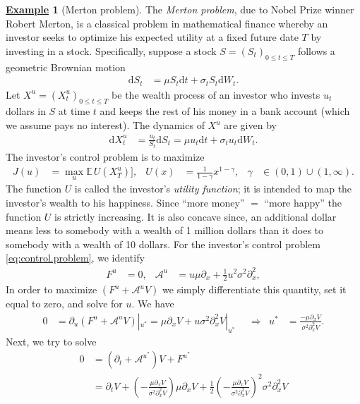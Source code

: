 \documentclass[12pt]{book}
\numberwithin{equation}{chapter}
\theoremstyle{plain}
\numberwithin{theorem}{section}
\theoremstyle{definition}
\newtheorem{example}[theorem]{\underline{Example}}
\numberwithin{exercise}{chapter}
\newcommand{\<}{\langle}
\renewcommand{\>}{\rangle}
\renewcommand{\(}{\left(}
\renewcommand{\)}{\right)}
\renewcommand{\[}{\left[}
\renewcommand{\]}{\right]}
\newcommand\Eb{\mathds{E}}
\newcommand\Ac{\mathscr{A}}
\newcommand\sig{\sigma}
\newcommand\gam{\gamma}
\renewcommand\d{\partial}
\newcommand\dd{\mathrm{d}}
\begin{document}
\begin{example}[Merton problem]
\label{ex:merton}
The \emph{Merton problem}, due to Nobel Prize winner Robert Merton, is a classical problem in mathematical finance whereby an investor seeks to optimize his expected utility at a fixed future date $T$ by investing in a stock.  Specifically, suppose a stock $S=(S_t)_{0 \leq t \leq T}$ follows a geometric Brownian motion
\begin{align}
\dd S_t
	&=	\mu S_t \dd t + \sig_t S_t \dd W_t .
\end{align}
Let $X^u = (X_t^u)_{0 \leq t \leq T}$ be the wealth process of an investor who invests $u_t$ dollars in $S$ at time $t$ and keeps the rest of his money in a bank account (which we assume pays no interest).  The dynamics of $X^u$ are given by
\begin{align}
\dd X_t^u
	&=	\frac{u_t}{S_t} \dd S_t 
	=		\mu u_t \dd t + \sig_t u_t \dd W_t .
\end{align}  
The investor's control problem is to maximize
\begin{align}
J(u)
	&=	\max_u \Eb \, U(X_T^u) ] , &
U(x)
	&=	\frac{1}{1-\gam} x^{1-\gam} , &
\gam
	&\in (0,1) \cup (1,\infty) . \label{eq:control.problem}
\end{align}
The function $U$ is called the investor's \emph{utility function}; it is intended to map the investor's wealth to his happiness.  Since ``more money'' $=$ ``more happy'' the function $U$ is strictly increasing.  It is also concave since, an additional dollar means less to somebody with a wealth of 1 million dollars than it does to somebody with a wealth of 10 dollars.  For the investor's control problem \eqref{eq:control.problem}, we identify
\begin{align}
F^u
	&=	0 , &
\Ac^u
	&=	u \mu \d_x + \tfrac{1}{2} u^2 \sig^2 \d_x^2 , 
\end{align}
In order to maximize $(F^u + \Ac^u V)$ we simply differentiate this quantity, set it equal to zero, and solve for $u$.  We have
\begin{align}
0
	&=	\d_u \( F^u + \Ac^u V \) |_{u^*}
	=		\mu \d_x V + u \sig^2 \d_x^2 V |_{u^*} &
	&\Rightarrow&
u^*
	&=	\frac{- \mu \d_x V}{\sig^2 \d_x^2 V} .
\end{align}
Next, we try to solve
\begin{align}
0
	&=	( \d_t + \Ac^{u^*} ) V + F^{u^*} \\
	&=		\d_t V + \( - \frac{\mu \d_x V}{\sig^2 \d_x^2 V} \) \mu \d_x V 
			+ \tfrac{1}{2} \( - \frac{\mu \d_x V}{\sig^2 \d_x^2 V} \)^2 \sig^2 \d_x^2 V \\ 

\end{align}
\end{example}
\end{document}
